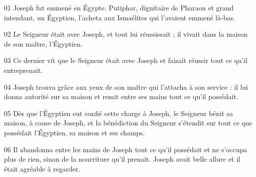 01 Joseph fut emmené en Égypte. Putiphar, dignitaire de Pharaon et grand intendant, un Égyptien, l’acheta aux Ismaélites qui l’avaient emmené là-bas.

02 Le Seigneur était avec Joseph, et tout lui réussissait ; il vivait dans la maison de son maître, l’Égyptien.

03 Ce dernier vit que le Seigneur était avec Joseph et faisait réussir tout ce qu’il entreprenait.

04 Joseph trouva grâce aux yeux de son maître qui l’attacha à son service : il lui donna autorité sur sa maison et remit entre ses mains tout ce qu’il possédait.

05 Dès que l’Égyptien eut confié cette charge à Joseph, le Seigneur bénit sa maison, à cause de Joseph, et la bénédiction du Seigneur s’étendit sur tout ce que possédait l’Égyptien, sa maison et ses champs.

06 Il abandonna entre les mains de Joseph tout ce qu’il possédait et ne s’occupa plus de rien, sinon de la nourriture qu’il prenait. Joseph avait belle allure et il était agréable à regarder.